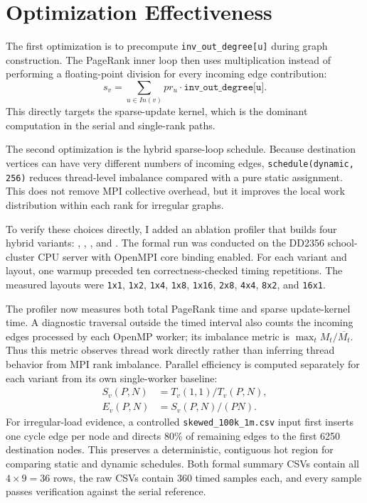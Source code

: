 \documentclass[11pt]{article}
\begin{document}
\section{Optimization Effectiveness}
\label{sec:wang-optimization}

The first optimization is to precompute \texttt{inv\_out\_degree[u]} during
graph construction. The PageRank inner loop then uses multiplication instead of
performing a floating-point division for every incoming edge contribution:
\[
s_v = \sum_{u\in In(v)} pr_u \cdot \texttt{inv\_out\_degree[u]}.
\]
This directly targets the sparse-update kernel, which is the dominant
computation in the serial and single-rank paths.

The second optimization is the hybrid sparse-loop schedule. Because
destination vertices can have very different numbers of incoming edges,
\texttt{schedule(dynamic, 256)} reduces thread-level imbalance compared with a
pure static assignment. This does not remove MPI collective overhead, but it
improves the local work distribution within each rank for irregular graphs.

To verify these choices directly, I added an ablation profiler that builds four
hybrid variants: , ,
, and . The formal run was conducted on
the DD2356 school-cluster CPU server with OpenMPI core binding enabled. For
each variant and layout, one warmup preceded ten correctness-checked timing
repetitions. The measured layouts were \texttt{1x1}, \texttt{1x2},
\texttt{1x4}, \texttt{1x8}, \texttt{1x16}, \texttt{2x8}, \texttt{4x4},
\texttt{8x2}, and \texttt{16x1}.

The profiler now measures both total PageRank time and sparse update-kernel
time. A diagnostic traversal outside the timed interval also counts the
incoming edges processed by each OpenMP worker; its imbalance metric is
$\max_t M_t/\overline{M_t}$. Thus this metric observes thread work directly
rather than inferring thread behavior from MPI rank imbalance. Parallel
efficiency is computed separately for each variant from its own single-worker
baseline:
\[
\begin{aligned}
S_v(P,N) &= T_v(1,1)/T_v(P,N),\\
E_v(P,N) &= S_v(P,N)/(PN).
\end{aligned}
\]
For irregular-load evidence, a controlled \texttt{skewed\_100k\_1m.csv}
input first inserts one cycle edge per node and directs 80\% of remaining
edges to the first 6250 destination nodes. This preserves a deterministic,
contiguous hot region for comparing static and dynamic schedules. Both formal
summary CSVs contain all $4\times9=36$ rows, the raw CSVs contain 360 timed
samples each, and every sample passes verification against the serial
reference.
\end{document}
